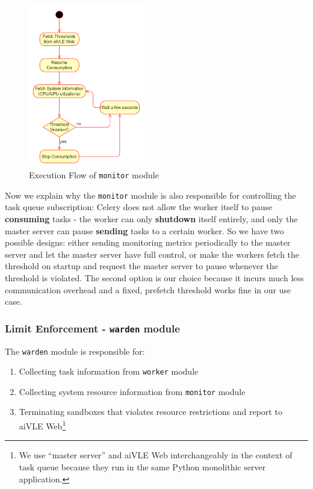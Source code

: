 \begin{figure}[H]
    \centering
    \includegraphics[width=0.45\textwidth]{images/aivle-worker-monitor-flow.png}
    \caption{Execution Flow of \texttt{monitor} module}
    \label{fig:aivle-worker-monitor-flow}
\end{figure}

Now we explain why the \texttt{monitor} module is also responsible for controlling the task queue subscription: Celery does not allow the worker itself to pause \textbf{consuming} tasks - the worker can only \textbf{shutdown} itself entirely, and only the master server can pause \textbf{sending} tasks to a certain worker. So we have two possible designs: either sending monitoring metrics periodically to the master server and let the master server have full control, or make the workers fetch the threshold on startup and request the master server to pause whenever the threshold is violated. The second option is our choice because it incurs much less communication overhead and a fixed, prefetch threshold works fine in our use case.

\subsubsection{Limit Enforcement - \texttt{warden} module}
\label{sss:warden}
The \texttt{warden} module is responsible for:
\begin{enumerate}
    \item Collecting task information from \texttt{worker} module
    \item Collecting system resource information from \texttt{monitor} module
    \item Terminating sandboxes that violates resource restrictions and report to aiVLE Web\footnote{We use ``master server'' and aiVLE Web interchangeably in the context of task queue because they run in the same Python monolithic server application.}
\end{enumerate}

